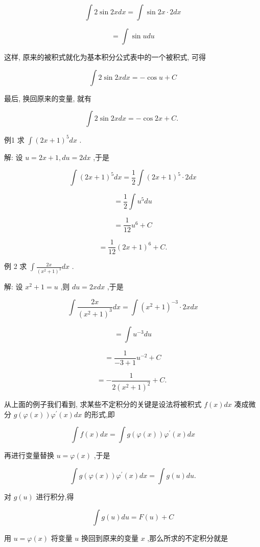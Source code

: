 \documentclass[10pt]{article}
\begin{document}
\[
\int 2\sin {2xdx} = \int \sin {2x} \cdot {2dx}
\]

\[
= \int \sin {udu}
\]

这样, 原来的被积式就化为基本积分公式表中的一个被积式, 可得

\[
\int 2\sin {2xdx} = - \cos u + C
\]

最后, 换回原来的变量, 就有

\[
\int 2\sin {2xdx} = - \cos {2x} + C\text{. }
\]

例1 求 \(\int {\left( 2x + 1\right) }^{5}{dx}\) .

解: 设 \(u = {2x} + 1,{du} = {2dx}\) ,于是

\[
\int {\left( 2x + 1\right) }^{5}{dx} = \frac{1}{2}\int {\left( 2x + 1\right) }^{5} \cdot {2dx}
\]

\[
= \frac{1}{2}\int {u}^{5}{du}
\]

\[
= \frac{1}{12}{u}^{6} + C
\]

\[
= \frac{1}{12}{\left( 2x + 1\right) }^{6} + C\text{.}
\]

例 2 求 \(\int \frac{2x}{{\left( {x}^{2} + 1\right) }^{3}}{dx}\) .

解: 设 \({x}^{2} + 1 = u\) ,则 \({du} = {2xdx}\) ,于是

\[
\int \frac{2x}{{\left( {x}^{2} + 1\right) }^{3}}{dx} = \int {\left( {x}^{2} + 1\right) }^{-3} \cdot {2xdx}
\]

\[
= \int {u}^{-3}{du}
\]

\[
= \frac{1}{-3 + 1}{u}^{-2} + C
\]

\[
= - \frac{1}{2{\left( {x}^{2} + 1\right) }^{2}} + C\text{. }
\]

从上面的例子我们看到, 求某些不定积分的关键是设法将被积式 \(f\left( x\right) {dx}\) 凑成微分 \(g\left( {\varphi \left( x\right) }\right) {\varphi }^{\prime }\left( x\right) {dx}\) 的形式,即

\[
\int f\left( x\right) {dx} = \int g\left( {\varphi \left( x\right) }\right) {\varphi }^{\prime }\left( x\right) {dx}
\]

再进行变量替换 \(u = \varphi \left( x\right)\) ,于是

\[
\int g\left( {\varphi \left( x\right) }\right) {\varphi }^{\prime }\left( x\right) {dx} = \int g\left( u\right) {du}.
\]

对 \(g\left( u\right)\) 进行积分,得

\[
\int g\left( u\right) {du} = F\left( u\right) + C
\]

用 \(u = \varphi \left( x\right)\) 将变量 \(u\) 换回到原来的变量 \(x\) ,那么所求的不定积分就是
\end{document}
